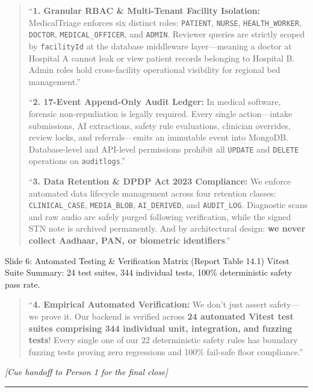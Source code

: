 \documentclass[11pt,a4paper]{article}
\begin{document}
\begin{quote}
``\textbf{1. Granular RBAC \& Multi-Tenant Facility Isolation:} MedicalTriage enforces six distinct roles: \texttt{PATIENT}, \texttt{NURSE}, \texttt{HEALTH\_WORKER}, \texttt{DOCTOR}, \texttt{MEDICAL\_OFFICER}, and \texttt{ADMIN}. Reviewer queries are strictly scoped by \texttt{facilityId} at the database middleware layer---meaning a doctor at Hospital A cannot leak or view patient records belonging to Hospital B. Admin roles hold cross-facility operational visibility for regional bed management.''

``\textbf{2. 17-Event Append-Only Audit Ledger:} In medical software, forensic non-repudiation is legally required. Every single action---intake submissions, AI extractions, safety rule evaluations, clinician overrides, review locks, and referrals---emits an immutable event into MongoDB. Database-level and API-level permissions prohibit all \texttt{UPDATE} and \texttt{DELETE} operations on \texttt{auditlogs}.''

``\textbf{3. Data Retention \& DPDP Act 2023 Compliance:} We enforce automated data lifecycle management across four retention classes: \texttt{CLINICAL\_CASE}, \texttt{MEDIA\_BLOB}, \texttt{AI\_DERIVED}, and \texttt{AUDIT\_LOG}. Diagnostic scans and raw audio are safely purged following verification, while the signed STN note is archived permanently. And by architectural design: \textbf{we never collect Aadhaar, PAN, or biometric identifiers}.''
\end{quote}

\begin{slidebox}{Slide 6: Automated Testing \& Verification Matrix (Report Table 14.1)}
Vitest Suite Summary: 24 test suites, 344 individual tests, 100\% deterministic safety pass rate.
\end{slidebox}

\begin{quote}
``\textbf{4. Empirical Automated Verification:} We don't just assert safety---we prove it. Our backend is verified across \textbf{24 automated Vitest test suites comprising 344 individual unit, integration, and fuzzing tests}! Every single one of our 22 deterministic safety rules has boundary fuzzing tests proving zero regressions and 100\% fail-safe floor compliance.''
\end{quote}

\noindent \textit{[Cue handoff to Person 1 for the final close]}

\vspace{4mm}
\hrule
\vspace{6mm}
\end{document}
